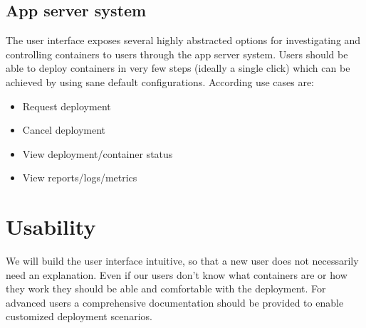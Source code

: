 \documentclass[a4paper,12pt,chapterprefix=false,bibliography=totoc,listof=totoc,]{scrreprt}
\begin{document}
\subsection{{\color{magenta} App server system}}
{\color{magenta}
The user interface exposes several highly abstracted options for investigating and controlling containers to users through the app server system. Users should be able to deploy containers in very few steps (ideally a single click) which can be achieved by using sane default configurations. According use cases are:

\begin{itemize}
    \item Request deployment
    \item Cancel deployment
    \item View deployment/container status
    \item View reports/logs/metrics
\end{itemize}
}

\section{{\color{magenta} Usability}}

{\color{magenta}
We will build the user interface intuitive, so that a new user does not necessarily need an explanation. Even if our users don't know what containers are or how they work they should be able and comfortable with the deployment. For advanced users a comprehensive documentation should be provided to enable customized deployment scenarios.
}
\end{document}
